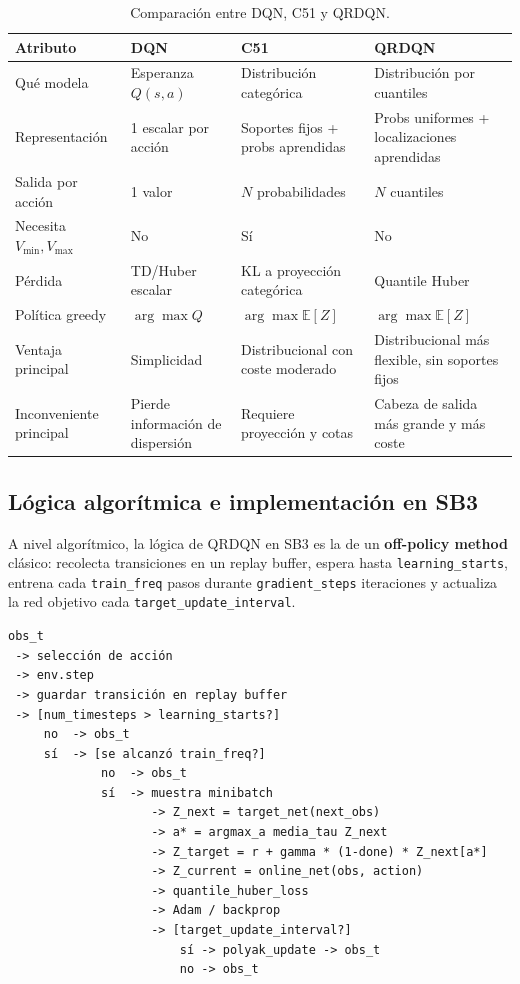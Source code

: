 ﻿\documentclass[12pt,a4paper]{article}
\begin{document}
\begin{table}[htbp]
\caption{Comparación entre DQN, C51 y QRDQN.}
\footnotesize
\begin{tabular}{p{3.5cm}p{3cm}p{3cm}p{4cm}}
\hline
\textbf{Atributo} & \textbf{DQN} & \textbf{C51} & \textbf{QRDQN} \\
\hline
Qué modela
  & Esperanza \(Q(s,a)\)
  & Distribución categórica
  & Distribución por cuantiles \\
Representación
  & 1 escalar por acción
  & Soportes fijos + probs aprendidas
  & Probs uniformes + localizaciones aprendidas \\
Salida por acción
  & 1 valor
  & \(N\) probabilidades
  & \(N\) cuantiles \\
Necesita \(V_{\min},V_{\max}\)
  & No & Sí & No \\
Pérdida
  & TD/Huber escalar
  & KL a proyección categórica
  & Quantile Huber \\
Política greedy
  & \(\arg\max Q\)
  & \(\arg\max \mathbb{E}[Z]\)
  & \(\arg\max \mathbb{E}[Z]\) \\
Ventaja principal
  & Simplicidad
  & Distribucional con coste moderado
  & Distribucional más flexible, sin soportes fijos \\
Inconveniente principal
  & Pierde información de dispersión
  & Requiere proyección y cotas
  & Cabeza de salida más grande y más coste \\
\hline
\end{tabular}
\end{table}

\subsection{Lógica algorítmica e implementación en SB3}

A nivel algorítmico, la lógica de QRDQN en SB3 es la de un \textbf{off-policy method} clásico:
recolecta transiciones en un replay buffer, espera hasta \texttt{learning\_starts}, entrena cada
\texttt{train\_freq} pasos durante \texttt{gradient\_steps} iteraciones y actualiza la red objetivo
cada \texttt{target\_update\_interval}.

\begin{verbatim}
obs_t
 -> selección de acción
 -> env.step
 -> guardar transición en replay buffer
 -> [num_timesteps > learning_starts?]
     no  -> obs_t
     sí  -> [se alcanzó train_freq?]
             no  -> obs_t
             sí  -> muestra minibatch
                    -> Z_next = target_net(next_obs)
                    -> a* = argmax_a media_tau Z_next
                    -> Z_target = r + gamma * (1-done) * Z_next[a*]
                    -> Z_current = online_net(obs, action)
                    -> quantile_huber_loss
                    -> Adam / backprop
                    -> [target_update_interval?]
                        sí -> polyak_update -> obs_t
                        no -> obs_t
\end{verbatim}
\end{document}
